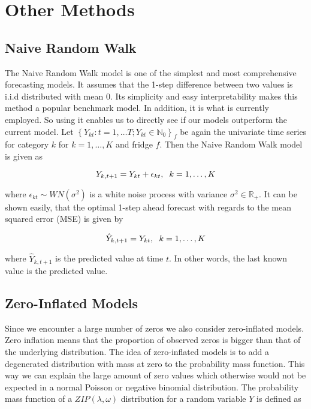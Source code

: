 \section{Other Methods}
\label{sec: Other methods}

\subsection{Naive Random Walk}
\label{sec: Naive Random Walk}

The Naive Random Walk model is one of the simplest and most comprehensive forecasting models. It assumes that the 1-step difference between two values is i.i.d distributed with mean 0. Its simplicity and easy interpretability makes this method a popular benchmark model. In addition, it is what is currently employed. So using it enables us to directly see if our models outperform the current model. Let $\left\{Y_{kt}:t=1,\ldots T; Y_{kt} \in \mathbb{N}_0\right\}_f$ be again the univariate time series for category $k$ for $k=1,\ldots,K$ and fridge $f$. Then the Naive Random Walk model is given as

\begin{equation}
Y_{k,t+1}= Y_{kt} + \epsilon_{kt},\hspace{0.2cm} k=1,\ldots,K
\label{eq: Random Walk Model}
\end{equation}
 
where $\epsilon_{kt} \sim WN(\sigma^2)$ is a white noise process with variance $\sigma^2 \in \mathbb{R}_+$. It can be shown easily, that the optimal 1-step ahead forecast with regards to the mean squared error (MSE) is given by

\begin{equation}
\hat{Y}_{k,t+1}= Y_{kt} ,\hspace{0.2cm} k=1,\ldots,K
\label{eq: Random Walk Model Prediction}
\end{equation}

where $\hat{Y}_{k,t+1}$ is the predicted value at time $t$. In other words, the last known value is the predicted value. 


\subsection{Zero-Inflated Models}
\label{sec: Zim}

Since we encounter a large number of zeros we also consider zero-inflated models. Zero inflation means that the proportion of observed zeros is bigger than that of the underlying distribution. The idea of zero-inflated models is to add a degenerated distribution with mass at zero to the probability mass function. This way we can explain the large amount of zero values which otherwise would not be expected in a normal Poisson or negative binomial distribution. The probability mass function of a $ZIP(\lambda,\omega)$ distribution for a random variable $Y$ is defined as \cite{Zhu:2012}

